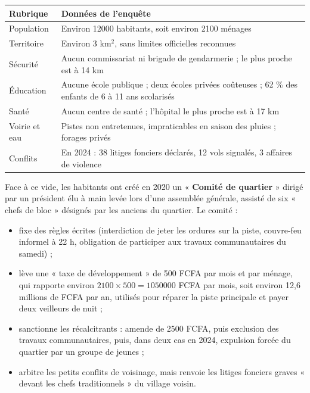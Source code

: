 \documentclass[11pt]{article}
\begin{document}
\begin{center}
\begin{tabularx}{\linewidth}{|l|X|}\hline
\rowcolor{popblueL} \textbf{Rubrique} & \textbf{Données de l'enquête} \\ \hline
Population & Environ \num{12000} habitants, soit environ \num{2100} ménages \\ \hline
Territoire & Environ 3 km$^2$, sans limites officielles reconnues \\ \hline
Sécurité & Aucun commissariat ni brigade de gendarmerie ; le plus proche est à 14 km \\ \hline
Éducation & Aucune école publique ; deux écoles privées coûteuses ; 62 \% des enfants de 6 à 11 ans scolarisés \\ \hline
Santé & Aucun centre de santé ; l'hôpital le plus proche est à 17 km \\ \hline
Voirie et eau & Pistes non entretenues, impraticables en saison des pluies ; forages privés \\ \hline
Conflits & En 2024 : 38 litiges fonciers déclarés, 12 vols signalés, 3 affaires de violence \\ \hline
\end{tabularx}
\end{center}

Face à ce vide, les habitants ont créé en 2020 un « \textbf{Comité de quartier} » dirigé par un président élu à main levée lors d'une assemblée générale, assisté de six « chefs de bloc » désignés par les anciens du quartier. Le comité :
\begin{itemize}
\item fixe des règles écrites (interdiction de jeter les ordures sur la piste, couvre-feu informel à 22 h, obligation de participer aux travaux communautaires du samedi) ;
\item lève une « taxe de développement » de 500 FCFA par mois et par ménage, qui rapporte environ $2100 \times 500 = \num{1050000}$ FCFA par mois, soit environ 12,6 millions de FCFA par an, utilisés pour réparer la piste principale et payer deux veilleurs de nuit ;
\item sanctionne les récalcitrants : amende de \num{2500} FCFA, puis exclusion des travaux communautaires, puis, dans deux cas en 2024, expulsion forcée du quartier par un groupe de jeunes ;
\item arbitre les petits conflits de voisinage, mais renvoie les litiges fonciers graves « devant les chefs traditionnels » du village voisin.
\end{itemize}
\end{document}
